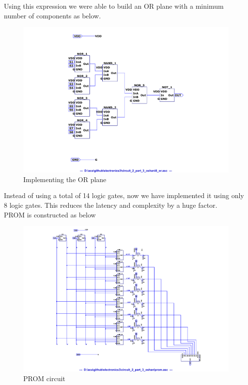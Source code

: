 \documentclass[a4paper,11pt]{article}%
\begin{document}
Using this expression we were able to build an OR plane with a minimum number of components as below.\\

\begin{figure}[H]
	\centering
	\includegraphics[scale=0.5]{figures/Figure333.pdf}
	\caption{Implementing the OR plane}
\end{figure}


Instead of using a total of 14 logic gates, now we have implemented it using only 8 logic gates. This reduces the latency and complexity by a huge factor.\\

PROM is constructed as below\\

\begin{figure}[H]
	\centering
	\includegraphics[scale=0.5]{figures/Figure334.pdf}
	\caption{PROM circuit}
\end{figure}
\end{document}
